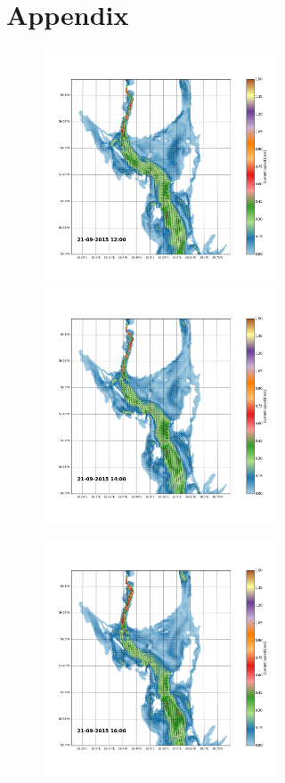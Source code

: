 \documentclass[12pt,a4paper,english]{article}
\begin{document}
\clearpage
\section*{\hspace{17mm}Appendix}

\begin{figure}[h]
\centerline{
\includegraphics*[trim=2.0cm 3cm 6.0cm 3.5cm,clip=true,height=7cm]{Python/stromfelt_70}
\includegraphics*[trim=3.7cm 3cm 1.3cm 3.5cm,clip=true,height=7cm]{Python/stromfelt_72}
}
\centerline{
\includegraphics*[trim=2.0cm 3cm 6.0cm 3.5cm,clip=true,height=7cm]{Python/stromfelt_74}
}
\end{figure}
\end{document}
